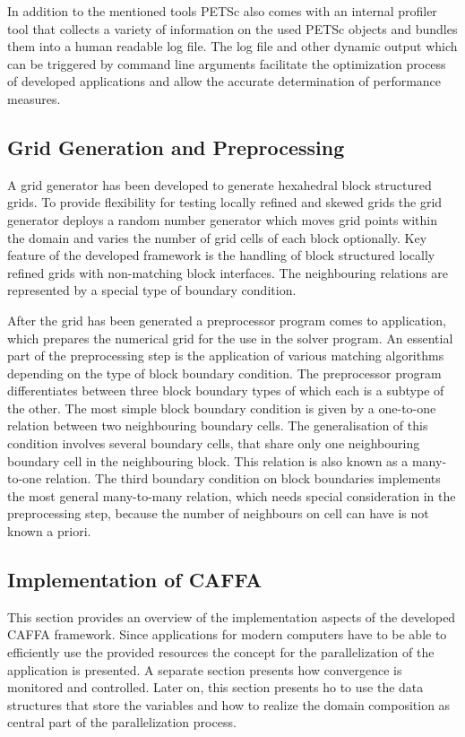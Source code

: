 In addition to the mentioned tools PETSc also comes with an internal profiler tool that collects a variety of information on the used PETSc objects and bundles them into a human readable log file. The log file and other dynamic output which can be triggered by command line arguments facilitate the optimization process of developed applications and allow the accurate determination of performance measures.

\subsection{Grid Generation and Preprocessing}

A grid generator has been developed to generate hexahedral block structured grids. To provide flexibility for testing locally refined and skewed grids the grid generator deploys a random number generator which moves grid points within the domain and varies the number of grid cells of each block optionally. Key feature of the developed framework is the handling of block structured locally refined grids with non-matching block interfaces. The neighbouring relations are represented by a special type of boundary condition.

After the grid has been generated a preprocessor program comes to application, which prepares the numerical grid for the use in the solver program. An essential part of the preprocessing step is the application of various matching algorithms depending on the type of block boundary condition. The preprocessor program differentiates between three block boundary types of which each is a subtype of the other. The most simple block boundary condition is given by a one-to-one relation between two neighbouring boundary cells. The generalisation of this condition involves several boundary cells, that share only one neighbouring boundary cell in the neighbouring block. This relation is also known as a many-to-one relation. The third boundary condition on block boundaries implements the most general many-to-many relation, which needs special consideration in the preprocessing step, because the number of neighbours on cell can have is not known a priori.

\subsection{Implementation of CAFFA}

This section provides an overview of the implementation aspects of the developed CAFFA framework. Since applications for modern computers have to be able to efficiently use the provided resources the concept for the parallelization of the application is presented. A separate section presents how convergence is monitored and controlled. Later on, this section presents ho to use the data structures that store the variables and how to realize the domain composition as central part of the parallelization process.

